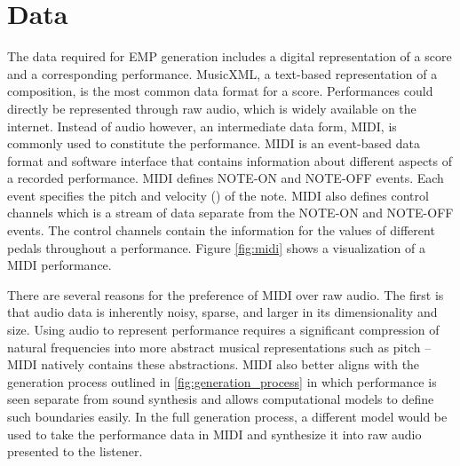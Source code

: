 \section{Data}
The data required for EMP generation includes a digital representation of a score and a corresponding performance. MusicXML, a text-based representation of a composition, is the most common data format for a score. Performances could directly be represented through raw audio, which is widely available on the internet. Instead of audio however, an intermediate data form, MIDI, is commonly used to constitute the performance. MIDI is an event-based data format and software interface that contains information about different aspects of a recorded performance. MIDI defines NOTE-ON and NOTE-OFF events. Each event specifies the pitch and velocity () of the note. MIDI also defines control channels which is a stream of data separate from the NOTE-ON and NOTE-OFF events. The control channels contain the information for the values of different pedals throughout a performance. Figure \ref{fig:midi} shows a visualization of a MIDI performance. 

There are several reasons for the preference of MIDI over raw audio. The first is that audio data is inherently noisy, sparse, and larger in its dimensionality and size. Using audio to represent performance requires a significant compression of natural frequencies into more abstract musical representations such as pitch -- MIDI natively contains these abstractions. MIDI also better aligns with the generation process outlined in \ref{fig:generation_process} in which performance is seen separate from sound synthesis and allows computational models to define such boundaries easily. In the full generation process, a different model would be used to take the performance data in MIDI and synthesize it into raw audio presented to the listener. 

